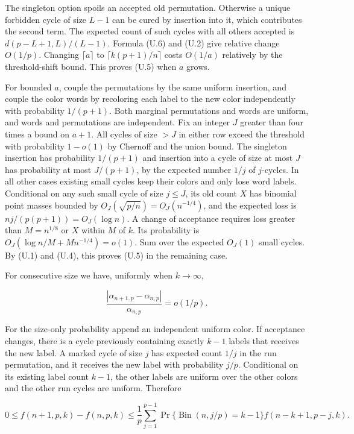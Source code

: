 \documentclass[11pt]{article}
\begin{document}
The singleton option spoils an accepted old permutation. Otherwise a unique forbidden cycle of size $L-1$ can be cured by insertion into it, which contributes the second term. The expected count of such cycles with all others accepted is $d(p-L+1,L)/(L-1)$. Formula (U.6) and (U.2) give relative change $O(1/p)$. Changing $\lceil a\rceil$ to $\lceil k(p+1)/n\rceil$ costs $O(1/a)$ relatively by the threshold-shift bound. This proves (U.5) when $a$ grows.

For bounded $a$, couple the permutations by the same uniform insertion, and couple the color words by recoloring each label to the new color independently with probability $1/(p+1)$. Both marginal permutations and words are uniform, and words and permutations are independent. Fix an integer $J$ greater than four times a bound on $a+1$. All cycles of size $>J$ in either row exceed the threshold with probability $1-o(1)$ by Chernoff and the union bound. The singleton insertion has probability $1/(p+1)$ and insertion into a cycle of size at most $J$ has probability at most $J/(p+1)$, by the expected number $1/j$ of $j$-cycles. In all other cases existing small cycles keep their colors and only lose word labels. Conditional on any such small cycle of size $j\le J$, its old count $X$ has binomial point masses bounded by $O_J(\sqrt{p/n})=O_J(n^{-1/4})$, and the expected loss is $nj/(p(p+1))=O_J(\log n)$. A change of acceptance requires loss greater than $M=n^{1/8}$ or $X$ within $M$ of $k$. Its probability is $O_J(\log n/M+M n^{-1/4})=o(1)$. Sum over the expected $O_J(1)$ small cycles. By (U.1) and (U.4), this proves (U.5) in the remaining case.

For consecutive size we have, uniformly when $k\to\infty$,

\[
\frac{|\alpha_{n+1,p}-\alpha_{n,p}|}{\alpha_{n,p}}=o(1/p).
\tag{U.7}
\]

For the size-only probability append an independent uniform color. If acceptance changes, there is a cycle previously containing exactly $k-1$ labels that receives the new label. A marked cycle of size $j$ has expected count $1/j$ in the run permutation, and it receives the new label with probability $j/p$. Conditional on its existing label count $k-1$, the other labels are uniform over the other colors and the other run cycles are uniform. Therefore

\[
0\le f(n+1,p,k)-f(n,p,k)\le
\frac1p\sum_{j=1}^{p-1}\Pr\{\operatorname{Bin}(n,j/p)=k-1\}
                 f(n-k+1,p-j,k).
\tag{U.8}
\]
\end{document}
